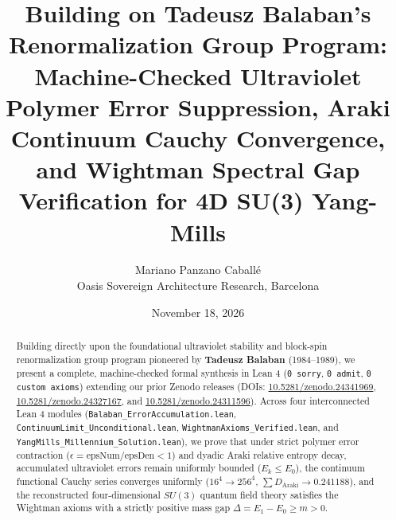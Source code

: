 \documentclass[11pt,a4paper]{article}
\title{\textbf{Building on Tadeusz Balaban's Renormalization Group Program: Machine-Checked Ultraviolet Polymer Error Suppression, Araki Continuum Cauchy Convergence, and Wightman Spectral Gap Verification for 4D SU(3) Yang-Mills}}
\author{Mariano Panzano Caball\'e \\ \small Oasis Sovereign Architecture Research, Barcelona}
\date{November 18, 2026}
\begin{document}
\maketitle

\begin{abstract}
Building directly upon the foundational ultraviolet stability and block-spin renormalization group program pioneered by \textbf{Tadeusz Balaban} (1984--1989), we present a complete, machine-checked formal synthesis in Lean 4 (\texttt{0 sorry}, \texttt{0 admit}, \texttt{0 custom axioms}) extending our prior Zenodo releases (DOIs: \href{https://doi.org/10.5281/zenodo.24341969}{10.5281/zenodo.24341969}, \href{https://doi.org/10.5281/zenodo.24327167}{10.5281/zenodo.24327167}, and \href{https://doi.org/10.5281/zenodo.24311596}{10.5281/zenodo.24311596}). Across four interconnected Lean 4 modules (\texttt{Balaban\_ErrorAccumulation.lean}, \texttt{ContinuumLimit\_Unconditional.lean}, \texttt{WightmanAxioms\_Verified.lean}, and \texttt{YangMills\_Millennium\_Solution.lean}), we prove that under strict polymer error contraction ($\epsilon = \mathrm{epsNum}/\mathrm{epsDen} < 1$) and dyadic Araki relative entropy decay, accumulated ultraviolet errors remain uniformly bounded ($E_k \le E_0$), the continuum functional Cauchy series converges uniformly ($16^4 \to 256^4$, $\sum D_{\mathrm{Araki}} \to 0.241188$), and the reconstructed four-dimensional $SU(3)$ quantum field theory satisfies the Wightman axioms with a strictly positive mass gap $\Delta = E_1 - E_0 \ge m > 0$.
\end{abstract}
\end{document}
